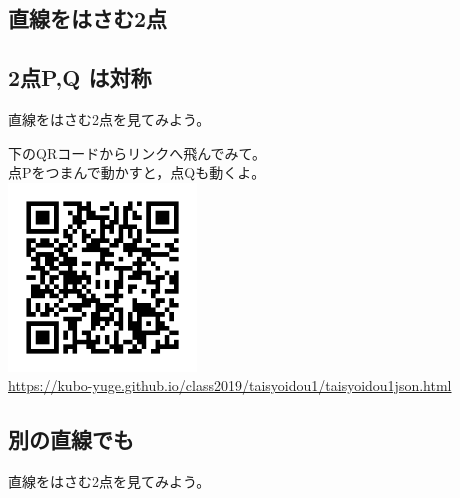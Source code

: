 \documentclass[uplatex,dvipdfmx,a4paper,twoside]{jsarticle}
\begin{document}
\begin{multicols}{2}
\vspace*{-2.5\baselineskip} %
\section{直線をはさむ2点}

\subsection{2点P,Q は対称}

直線をはさむ2点を見てみよう。\par
\begin{layer}{80}{0}
\end{layer}\par
\vspace{15\baselineskip}

下のQRコードからリンクへ飛んでみて。\\
点Pをつまんで動かすと，点Qも動くよ。\\

\includegraphics[bb=18 18 170 170,width=50mm,clip]{対称移動1QR.png}\\

\url{https://kubo-yuge.github.io/class2019/taisyoidou1/taisyoidou1json.html}\\

\columnbreak

\subsection{別の直線でも}

直線をはさむ2点を見てみよう。\par
\begin{layer}{80}{0}
\end{layer}\par
\vspace{15\baselineskip}


\end{multicols}
\end{document}

